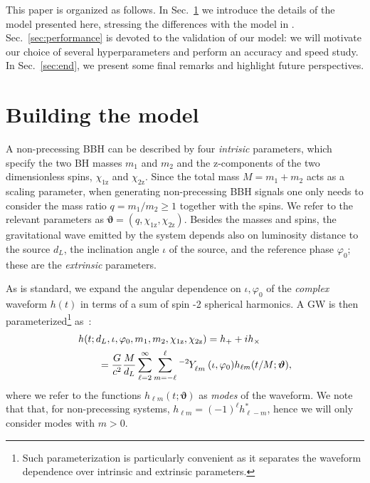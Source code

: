 \documentclass[twocolumn,showpacs,preprintnumbers,nofootinbib,prd,
superscriptaddress,10pt]{revtex4-2}
\begin{document}
This paper is organized as follows. In Sec.~\ref{sec:model} we introduce the details of the model presented here, 
stressing the differences with the model in  \cite{Schmidt:2020yuu}.
Sec.~\ref{sec:performance} is devoted to the validation of our model: we will motivate our choice of several 
hyperparameters and perform an accuracy and speed study.
In Sec.~\ref{sec:end}, we present some final remarks and highlight future perspectives.

\section{Building the model}
\label{sec:model}

A non-precessing BBH can be described by four {\it intrisic} parameters, which specify the two BH masses $m_1$ and $m_2$ 
and the z-components of the two dimensionless spins, $\chi_\text{1z}$ and $\chi_\text{2z}$.
Since the total mass $M = m_1 + m_2$ acts as a scaling parameter, when generating non-precessing BBH signals one  
only needs to consider the mass ratio $q = m_1/m_2 \geq 1$ together with the spins. 
We refer to the relevant parameters as $\boldsymbol{\vartheta} = (q, \chi_\text{1z}, \chi_\text{2z})$.
Besides the masses and spins, the gravitational wave emitted by the system depends also on 
luminosity distance to the source $d_L$, the inclination angle $\iota$ of the source, and the reference phase 
$\varphi_0$; these are the {\it extrinsic} parameters.

As is standard, we expand the angular dependence on $\iota, \varphi_0$ of the {\it complex} waveform $h(t)$ 
in terms of a sum of spin -2 spherical harmonics.
A GW is then parameterized\footnote{Such parameterization is particularly convenient as it separates 
the waveform dependence over intrinsic and extrinsic parameters.} as~\cite{Estelles:2021gvs}:
\begin{align} \label{eq:h_parametrization}
	&h(t; d_L,\iota,\varphi_0, m_1, m_2, \chi_\text{1z}, \chi_\text{2z}) = h_+ + i h_\times \nonumber \\
		&\qquad= \frac{G}{c^2} \frac{M}{d_L}\sum_{\ell = 2}^{\infty} \sum_{m = -\ell}^{\ell} \tensor[^{-2}]{Y}{_{\ell m}}(\iota, \varphi_0) h_{\ell m}(t/M; \boldsymbol{\vartheta}),
\end{align}
where we refer to the functions $h_{\ell m}(t; \boldsymbol{\vartheta})$ as {\it modes} of the waveform. We note that that, 
for non-precessing systems, $h_{\ell m} = (-1)^\ell h^*_{\ell -m}$, hence we will only consider modes with $m>0$.
\end{document}
